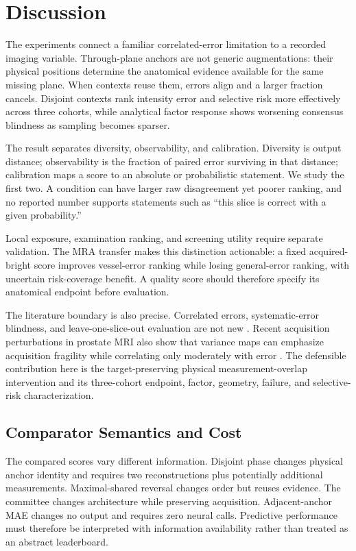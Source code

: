 \documentclass[journal,10pt]{IEEEtran}
\begin{document}
\section{Discussion}
The experiments connect a familiar correlated-error limitation to a recorded imaging variable. Through-plane anchors are not generic augmentations: their physical positions determine the anatomical evidence available for the same missing plane. When contexts reuse them, errors align and a larger fraction cancels. Disjoint contexts rank intensity error and selective risk more effectively across three cohorts, while analytical factor response shows worsening consensus blindness as sampling becomes sparser.

The result separates diversity, observability, and calibration. Diversity is output distance; observability is the fraction of paired error surviving in that distance; calibration maps a score to an absolute or probabilistic statement. We study the first two. A condition can have larger raw disagreement yet poorer ranking, and no reported number supports statements such as ``this slice is correct with a given probability.''

Local exposure, examination ranking, and screening utility require separate validation. The MRA transfer makes this distinction actionable: a fixed acquired-bright score improves vessel-error ranking while losing general-error ranking, with uncertain risk-coverage benefit. A quality score should therefore specify its anatomical endpoint before evaluation.

The literature boundary is also precise. Correlated errors, systematic-error blindness, and leave-one-slice-out evaluation are not new \cite{brown2005diversity,hu2021predict,horvath2017highorder}. Recent acquisition perturbations in prostate MRI also show that variance maps can emphasize acquisition fragility while correlating only moderately with error \cite{vandervelde2026prostate}. The defensible contribution here is the target-preserving physical measurement-overlap intervention and its three-cohort endpoint, factor, geometry, failure, and selective-risk characterization.

\subsection{Comparator Semantics and Cost}
The compared scores vary different information. Disjoint phase changes physical anchor identity and requires two reconstructions plus potentially additional measurements. Maximal-shared reversal changes order but reuses evidence. The committee changes architecture while preserving acquisition. Adjacent-anchor MAE changes no output and requires zero neural calls. Predictive performance must therefore be interpreted with information availability rather than treated as an abstract leaderboard.
\end{document}
